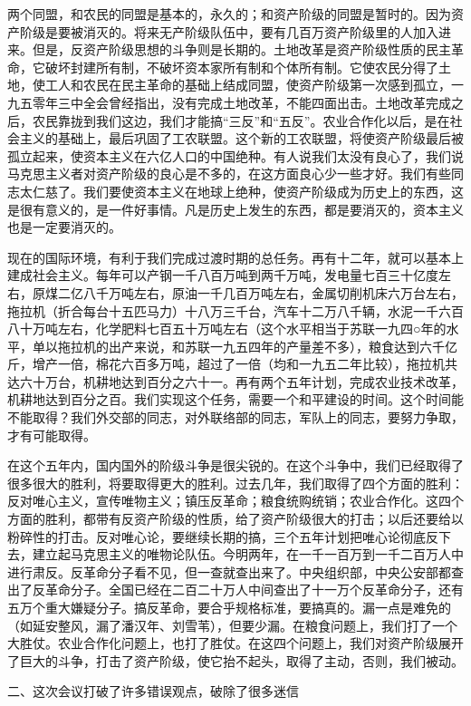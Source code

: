 两个同盟，和农民的同盟是基本的，永久的；和资产阶级的同盟是暂时的。因为资产阶级是要被消灭的。将来无产阶级队伍中，要有几百万资产阶级里的人加入进来。但是，反资产阶级思想的斗争则是长期的。土地改革是资产阶级性质的民主革命，它破坏封建所有制，不破坏资本家所有制和个体所有制。它使农民分得了土地，使工人和农民在民主革命的基础上结成同盟，使资产阶级第一次感到孤立，一九五零年三中全会曾经指出，没有完成土地改革，不能四面出击。土地改革完成之后，农民靠拢到我们这边，我们才能搞“三反”和“五反”。农业合作化以后，是在社会主义的基础上，最后巩固了工农联盟。这个新的工农联盟，将使资产阶级最后被孤立起来，使资本主义在六亿人口的中国绝种。有人说我们太没有良心了，我们说马克思主义者对资产阶级的良心是不多的，在这方面良心少一些才好。我们有些同志太仁慈了。我们要使资本主义在地球上绝种，使资产阶级成为历史上的东西，这是很有意义的，是一件好事情。凡是历史上发生的东西，都是要消灭的，资本主义也是一定要消灭的。

现在的国际环境，有利于我们完成过渡时期的总任务。再有十二年，就可以基本上建成社会主义。每年可以产钢一千八百万吨到两千万吨，发电量七百三十亿度左右，原煤二亿八千万吨左右，原油一千几百万吨左右，金属切削机床六万台左右，拖拉机（折合每台十五匹马力）十八万三千台，汽车十二万八千辆，水泥一千六百八十万吨左右，化学肥料七百五十万吨左右（这个水平相当于苏联一九四○年的水平，单以拖拉机的出产来说，和苏联一九五四年的产量差不多），粮食达到六千亿斤，增产一倍，棉花六百多万吨，超过了一倍（均和一九五二年比较），拖拉机共达六十万台，机耕地达到百分之六十一。再有两个五年计划，完成农业技术改革，机耕地达到百分之百。我们实现这个任务，需要一个和平建设的时间。这个时间能不能取得？我们外交部的同志，对外联络部的同志，军队上的同志，要努力争取，才有可能取得。

在这个五年内，国内国外的阶级斗争是很尖锐的。在这个斗争中，我们已经取得了很多很大的胜利，将要取得更大的胜利。过去几年，我们取得了四个方面的胜利：反对唯心主义，宣传唯物主义；镇压反革命；粮食统购统销；农业合作化。这四个方面的胜利，都带有反资产阶级的性质，给了资产阶级很大的打击；以后还要给以粉碎性的打击。反对唯心论，要继续长期的搞，三个五年计划把唯心论彻底反下去，建立起马克思主义的唯物论队伍。今明两年，在一千一百万到一千二百万人中进行肃反。反革命分子看不见，但一查就查出来了。中央组织部，中央公安部都查出了反革命分子。全国已经在二百二十万人中间查出了十一万个反革命分子，还有五万个重大嫌疑分子。搞反革命，要合乎规格标准，要搞真的。漏一点是难免的（如延安整风，漏了潘汉年、刘雪苇），但要少漏。在粮食问题上，我们打了一个大胜仗。农业合作化问题上，也打了胜仗。在这四个问题上，我们对资产阶级展开了巨大的斗争，打击了资产阶级，使它抬不起头，取得了主动，否则，我们被动。

二、这次会议打破了许多错误观点，破除了很多迷信

